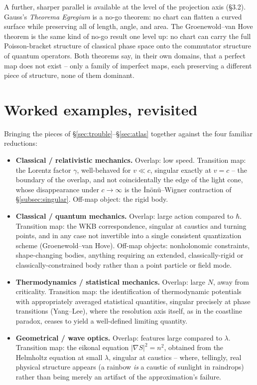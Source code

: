 A further, sharper parallel is available at the level of the projection axis (\S3.2). Gauss's \emph{Theorema Egregium} is a no-go theorem: no chart can flatten a curved surface while preserving all of length, angle, and area. The Groenewold--van Hove theorem is the same kind of no-go result one level up: no chart can carry the full Poisson-bracket structure of classical phase space onto the commutator structure of quantum operators. Both theorems say, in their own domains, that a perfect map does not exist -- only a family of imperfect maps, each preserving a different piece of structure, none of them dominant.

\section{Worked examples, revisited}
\label{sec:examples}

Bringing the pieces of \S\ref{sec:trouble}--\S\ref{sec:atlas} together against the four familiar reductions:

\begin{itemize}
\item \textbf{Classical / relativistic mechanics.} Overlap: low speed. Transition map: the Lorentz factor $\gamma$, well-behaved for $v\ll c$, singular exactly at $v=c$ -- the boundary of the overlap, and not coincidentally the edge of the light cone, whose disappearance under $c\to\infty$ is the \.In\"on\"u--Wigner contraction of \S\ref{subsec:singular}. Off-map object: the rigid body.
\item \textbf{Classical / quantum mechanics.} Overlap: large action compared to $\hbar$. Transition map: the WKB correspondence, singular at caustics and turning points, and in any case not invertible into a single consistent quantization scheme (Groenewold--van Hove). Off-map objects: nonholonomic constraints, shape-changing bodies, anything requiring an extended, classically-rigid or classically-constrained body rather than a point particle or field mode.
\item \textbf{Thermodynamics / statistical mechanics.} Overlap: large $N$, away from criticality. Transition map: the identification of thermodynamic potentials with appropriately averaged statistical quantities, singular precisely at phase transitions (Yang--Lee), where the resolution axis itself, as in the coastline paradox, ceases to yield a well-defined limiting quantity.
\item \textbf{Geometrical / wave optics.} Overlap: features large compared to $\lambda$. Transition map: the eikonal equation $|\nabla S|^2=n^2$, obtained from the Helmholtz equation at small $\lambda$, singular at caustics -- where, tellingly, real physical structure appears (a rainbow \emph{is} a caustic of sunlight in raindrops) rather than being merely an artifact of the approximation's failure.
\end{itemize}

